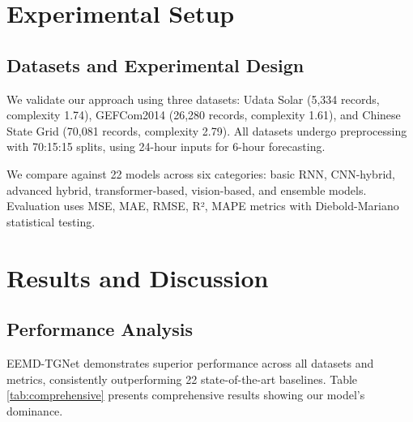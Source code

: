 \documentclass[conference]{IEEEtran}
\begin{document}
\section{Experimental Setup}
\subsection{Datasets and Experimental Design}
We validate our approach using three datasets: Udata Solar (5,334 records, complexity 1.74), GEFCom2014 (26,280 records, complexity 1.61), and Chinese State Grid (70,081 records, complexity 2.79). All datasets undergo preprocessing with 70:15:15 splits, using 24-hour inputs for 6-hour forecasting.

We compare against 22 models across six categories: basic RNN, CNN-hybrid, advanced hybrid, transformer-based, vision-based, and ensemble models. Evaluation uses MSE, MAE, RMSE, R², MAPE metrics with Diebold-Mariano statistical testing.

\section{Results and Discussion}
\subsection{Performance Analysis}
EEMD-TGNet demonstrates superior performance across all datasets and metrics, consistently outperforming 22 state-of-the-art baselines. Table \ref{tab:comprehensive} presents comprehensive results showing our model's dominance.

\begin{table}[htbp]
\centering
\caption{Comprehensive performance comparison across datasets}
\label{tab:comprehensive}
\end{table}
\end{document}

